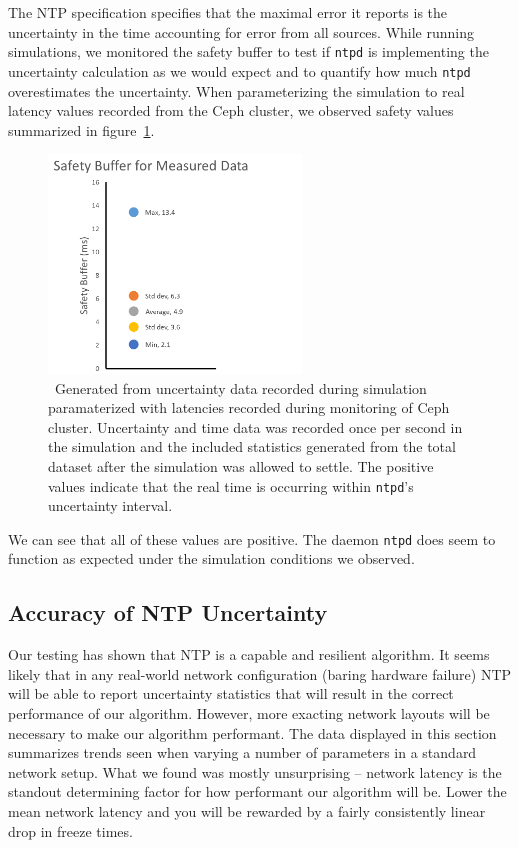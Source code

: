 The NTP specification specifies that the maximal error it reports is the 
uncertainty in the time accounting for error from all sources.
While running simulations, we monitored the safety buffer to test if 
\texttt{ntpd} is implementing the uncertainty calculation as we would expect
and to quantify how much \texttt{ntpd} overestimates the uncertainty.
When parameterizing the simulation to real latency values recorded from the 
Ceph cluster, we observed safety values summarized in figure~\ref{fig:safety-data}.

\begin{figure}[h]
  \caption{~Generated from uncertainty data recorded during simulation paramaterized
  with latencies recorded during monitoring of Ceph cluster. Uncertainty and time
  data was recorded once per second in the simulation and the included statistics 
  generated from the total dataset after the simulation was allowed to settle. 
  The positive values indicate that the real time is occurring within \texttt{ntpd}'s 
  uncertainty interval.}
  \label{fig:safety-data}
  \centering
  \includegraphics[width=0.6\textwidth]{5pointsSafety.png}
\end{figure}

We can see that all of these values are positive. The daemon \texttt{ntpd} 
does seem to function as expected under the simulation conditions we observed. 

\subsection{Accuracy of NTP Uncertainty}

Our testing has shown that NTP is a capable and resilient
algorithm. It seems likely that in any real-world network
configuration (baring hardware failure) NTP will be able to report
uncertainty statistics that will result in the correct performance of our
algorithm. However, more exacting network layouts will be necessary to
make our algorithm performant. The data displayed in this section
summarizes trends seen when varying a number of parameters in a
standard network setup. What we found was mostly unsurprising -- network 
latency is the standout determining factor for how performant
our algorithm will be. Lower the mean network latency and you will be
rewarded by a fairly consistently linear drop in freeze times.

